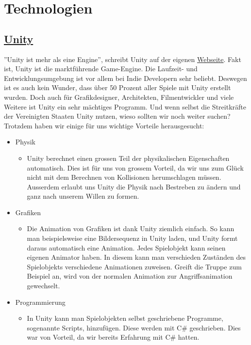 \chapter{Technologien}

\section{\href{https://unity.com/}{Unity}}
''Unity ist mehr als eine Engine'', schreibt Unity auf der eigenen \href{https://unity.com/pages/more-than-an-engine}{Webseite}. Fakt ist, Unity ist die marktführende Game-Engine. Die Laufzeit- und Entwicklungsumgebung 
ist vor allem bei \gls{Indie Developer}n sehr beliebt. Deswegen ist es auch kein Wunder, dass über 50 Prozent aller Spiele mit Unity erstellt wurden. 
Doch auch für Grafikdesigner, Architekten, Filmentwickler und viele Weitere ist Unity ein sehr mächtiges Programm. Und wenn selbst die Streitkräfte der Vereinigten Staaten Unity nutzen, wieso sollten wir 
noch weiter suchen? Trotzdem haben wir einige für uns wichtige Vorteile herausgesucht:\\

\begin{itemize}
    \item Physik
    \begin{itemize}
        \item Unity berechnet einen grossen Teil der physikalischen Eigenschaften automatisch. Dies ist für uns von grossem Vorteil, da wir uns zum Glück nicht mit dem Berechnen von Kollisionen herumschlagen müssen.
        Ausserdem erlaubt uns Unity die Physik nach Bestreben zu ändern und ganz nach unserem Willen zu formen.
    \end{itemize}
    \item Grafiken
    \begin{itemize}
        \item Die Animation von Grafiken ist dank Unity ziemlich einfach. So kann man beispielsweise eine Bildersequenz in Unity laden, und Unity formt daraus automatisch eine Animation. Jedes Spielobjekt kann seinen
        eigenen Animator haben. In diesem kann man verschieden Zuständen des Spielobjekts verschiedene Animationen zuweisen. Greift die Truppe zum Beispiel an, wird von der normalen Animation zur Angriffsanimation
        gewechselt.
    \end{itemize}
    \item Programmierung
    \begin{itemize}
        \item In Unity kann man Spielobjekten selbst geschriebene Programme, sogenannte Scripts, hinzufügen. Diese werden mit C\# geschrieben. Dies war von Vorteil, da wir bereits Erfahrung mit C\# hatten. 
    \end{itemize}
\end{itemize}

